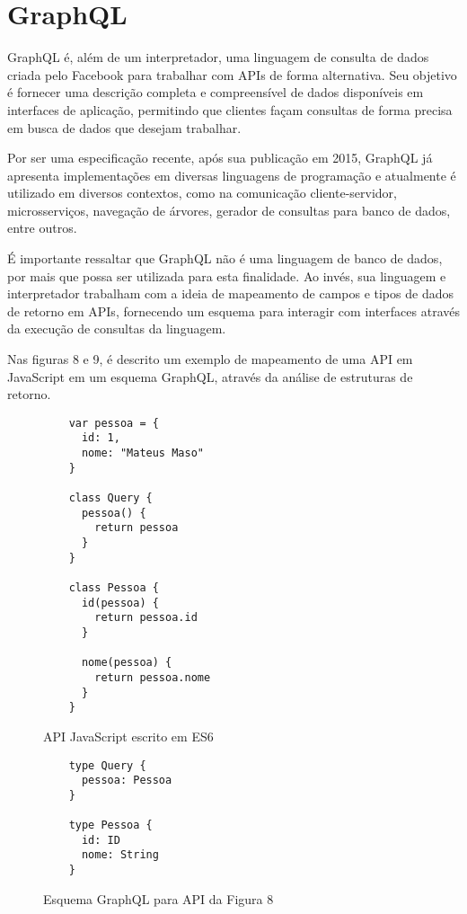 \chapter{GraphQL}

GraphQL é, além de um interpretador, uma linguagem de consulta de dados criada pelo Facebook para trabalhar com APIs de forma alternativa. Seu objetivo é fornecer uma descrição completa e compreensível de dados disponíveis em interfaces de aplicação, permitindo que clientes façam consultas de forma precisa em busca de dados que desejam trabalhar. \cite{Facebook2016}

Por ser uma especificação recente, após sua publicação em 2015, GraphQL já apresenta implementações em diversas linguagens de programação e atualmente é utilizado em diversos contextos, como na comunicação cliente-servidor, microsserviços, navegação de árvores, gerador de consultas para banco de dados, entre outros.

É importante ressaltar que GraphQL não é uma linguagem de banco de dados, por mais que possa ser utilizada para esta finalidade. Ao invés, sua linguagem e interpretador trabalham com a ideia de mapeamento de campos e tipos de dados de retorno em APIs, fornecendo um esquema para interagir com interfaces através da execução de consultas da linguagem. \cite{Facebook2016}

Nas figuras 8 e 9, é descrito um exemplo de mapeamento de uma API em JavaScript em um esquema GraphQL, através da análise de estruturas de retorno.

\begin{figure}[H]
  \centering
  \begin{verbatim}
    var pessoa = {
      id: 1,
      nome: "Mateus Maso"
    }

    class Query {
      pessoa() {
        return pessoa
      }
    }

    class Pessoa {
      id(pessoa) {
        return pessoa.id
      }

      nome(pessoa) {
        return pessoa.nome
      }
    }
  \end{verbatim}
  \caption{API JavaScript escrito em ES6}
\end{figure}

\begin{figure}[H]
  \centering
  \begin{verbatim}
    type Query {
      pessoa: Pessoa
    }

    type Pessoa {
      id: ID
      nome: String
    }
  \end{verbatim}
  \caption{Esquema GraphQL para API da Figura 8}
\end{figure}

